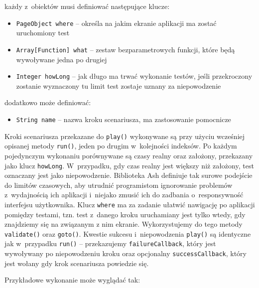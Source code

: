 \documentclass[brudnopis]{xmgr}
\begin{document}
\noindent każdy z~obiektów musi definiować następujące klucze:

\begin{itemize}
  \item \texttt{PageObject where} -- określa na jakim ekranie aplikacji ma zostać uruchomiony test
  \item \texttt{Array[Function] what} -- zestaw bezparametrowych funkcji, które będą wywoływane jedna po drugiej 
  \item \texttt{Integer howLong} -- jak długo ma trwać wykonanie testów, jeśli przekroczony zostanie wyznaczony tu limit test zostaje uznany za niepowodzenie 
\end{itemize}

\noindent dodatkowo może definiować:

\begin{itemize} 
  \item \texttt{String name} -- nazwa kroku scenariusza, ma zastosowanie pomocnicze
\end{itemize}

Kroki scenariusza przekazane do \texttt{play()} wykonywane są przy użyciu wcześniej opisanej metody \texttt{run()}, jeden po drugim w~kolejności indeksów. Po każdym pojedynczym wykonaniu porównywane są czasy realny oraz założony, przekazany jako klucz \texttt{howLong}. W~przypadku, gdy czas realny jest większy niż założony, test oznaczany jest jako niepowodzenie. Biblioteka Ash definiuje tak surowe podejście do limitów czasowych, aby utrudnić programistom ignorowanie problemów z~wydajnością ich aplikacji i~niejako zmusić ich do zadbania o~responsywność interfejsu użytkownika. Klucz \texttt{where} ma za zadanie ułatwić nawigację po aplikacji pomiędzy testami, tzn. test z~danego kroku uruchamiany jest tylko wtedy, gdy znajdziemy się na związanym z nim  ekranie. Wykorzystujemy do tego metody \texttt{validate()} oraz \texttt{goto()}. Kwestie sukcesu i~niepowodzenia \texttt{play()} są identyczne jak w~przypadku \texttt{run()} -- przekazujemy \texttt{failureCallback}, który jest wywoływany po niepowodzeniu kroku oraz opcjonalny \texttt{successCallback},  który jest wołany gdy krok scenariusza powiedzie się. 

\medskip \noindent Przykładowe wykonanie może wyglądać tak:
\end{document}

